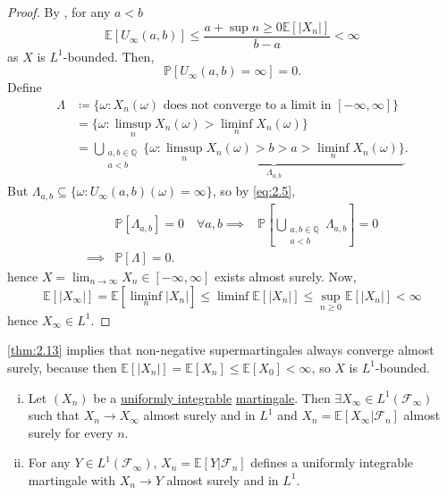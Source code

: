 \documentclass{article}
\newcommand{\F}{\mathcal{F}}
\newcommand{\1}[1]{\mathbbm{1}_{#1}}
\newcommand{\Prob}{\mathbb{P}}
\newcommand{\E}{\mathbb{E}}
\begin{document}
\begin{proof}
  By , for any $a < b$
  \begin{equation*}
  \E[U_\infty(a,b)] \leq \frac{a + \sup{n \geq 0} \E[|X_n|]}{b-a} < \infty
  \end{equation*}
  as $X$ is $L^1$-bounded.
  Then,
  \begin{equation}
    \Prob[U_\infty(a,b) = \infty] =0. \label{eq:2.5} \tag{2.5}
  \end{equation}
  Define
  \begin{align*}
    \Lambda &\coloneqq \{\omega : X_n(\omega) \text{ does not converge to a limit in } [-\infty, \infty]\} \\
            &= \{\omega : \limsup_n X_n(\omega) > \liminf_n X_n(\omega)\} \\
            &= \bigcup_{\substack{a,b \in \mathbb{Q} \\ a<b}} \underbrace{\{\omega : \limsup_n X_n(\omega) > b > a > \liminf_n X_n(\omega)\}}_{\Lambda_{a,b}}
  .\end{align*}
  But $\Lambda_{a,b} \subseteq \{\omega : U_\infty(a,b)(\omega) = \infty\}$, so by \eqref{eq:2.5},
  \begin{align*}
    &\Prob[\Lambda_{a,b}] = 0  \quad \forall a,b
    \implies &\Prob[\bigcup_{\substack{a,b \in \mathbb{Q} \\ a < b}} \Lambda_{a,b}] = 0 \\
    \implies &\Prob[\Lambda] = 0
  .\end{align*}
  hence $X = \lim_{n \to \infty} X_n \in [-\infty, \infty]$ exists almost surely.
  Now,
  \begin{equation*}
    \E[|X_\infty|] = \E[\liminf_n |X_n|] \leq \liminf \E[|X_n|] \leq \sup_{n \geq 0} \E[|X_n|] < \infty
  \end{equation*}
  hence $X_\infty \in L^1$.
\end{proof}
\begin{remark}
  \cref{thm:2.13} implies that non-negative supermartingales always converge almost surely, because then $\E[|X_n|] = \E[X_n] \leq \E[X_0] < \infty$, so $X$ is $L^1$-bounded.
\end{remark}
\begin{nthm}\label{thm:2.14}
  \begin{enumerate}[(i)]
    \item Let $(X_n)$ be a \hyperlink{def:ui}{uniformly integrable} \hyperlink{def:martingale}{martingale}. Then
      $\exists X_\infty \in L^1(\F_\infty)$ such that $X_n \to X_\infty$ almost surely and in $L^1$ and $X_n = \E[X_\infty | \F_n]$ almost surely for every $n$.
    \item For any $Y \in L^1(\F_\infty)$, $X_n = \E[Y | \F_n]$ defines a uniformly integrable martingale with $X_n \to Y$ almost surely and in $L^1$.
  \end{enumerate}
\end{nthm}
\end{document}
